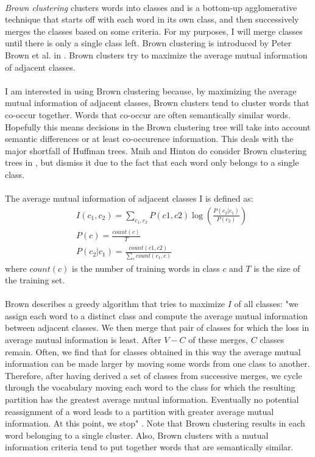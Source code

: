 \paragraph{}
\emph{Brown clustering} clusters words into classes and is a bottom-up agglomerative technique that starts off with each word in its own class, and then successively merges the classes based on some criteria. For my purposes, I will merge classes until there is only a single class left.  Brown clustering is introduced by Peter Brown et al. in \cite{Brown1992}.
Brown clusters try to maximize the average mutual information of adjacent classes.
\paragraph{}
I am interested in using Brown clustering because, by maximizing the average mutual information of adjacent classes, Brown clusters tend to cluster words that co-occur together. Words that co-occur are often semantically similar words. Hopefully this means decisions in the Brown clustering tree will take into account semantic differences or at least co-occurence information. This deals with the major shortfall of Huffman trees. Mnih and Hinton do consider Brown clustering trees in \cite{MnihHinton2009}, but dismiss it due to the fact that each word only belongs to a single class. 
\paragraph{}
The average mutual information of adjacent classes I is defined as:
\begin{align}
& I(c_1,c_2) =\sum_{c_1,c_2} P(c1,c2)  \log \left( \frac{P(c_2|c_1)}{P(c_2)} \right)
\\
&P(c) = \frac{count(c)}{T} \nonumber
\\
&P(c_2|c_1) = \frac{count(c1,c2)}{\sum_c count(c_1,c)} \nonumber
\end{align}
where $count(c)$ is the number of training words in class $c$ and $T$ is the size of the training set.
\paragraph{}
Brown describes a greedy algorithm that tries to maximize $I$ of all classes: "we assign each word to a distinct class and compute the average mutual information 
between adjacent classes. We then merge that pair of classes for which the loss in 
average mutual information is least. After $V - C$ of these merges, $C$ classes remain. 
Often, we find that for classes obtained in this way the average mutual information 
can be made larger by moving some words from one class to another. Therefore, after 
having derived a set of classes from successive merges, we cycle through the vocabulary moving each word to the class for which the resulting partition has the greatest 
average mutual information. Eventually no potential reassignment of a word leads to 
a partition with greater average mutual information. At this point, we stop" \cite[pg. 472]{Brown1992}.  
Note that Brown clustering results in each word belonging to a single cluster. Also, Brown clusters with a mutual information criteria tend to put together words that are semantically similar.
